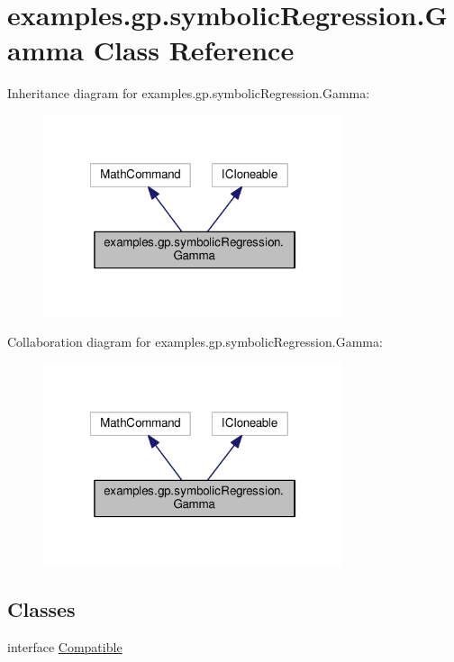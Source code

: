 \hypertarget{classexamples_1_1gp_1_1symbolic_regression_1_1_gamma}{\section{examples.\-gp.\-symbolic\-Regression.\-Gamma Class Reference}
\label{classexamples_1_1gp_1_1symbolic_regression_1_1_gamma}
}


Inheritance diagram for examples.\-gp.\-symbolic\-Regression.\-Gamma\-:
\nopagebreak
\begin{figure}[H]
\begin{center}
\leavevmode
\includegraphics[width=249pt]{classexamples_1_1gp_1_1symbolic_regression_1_1_gamma__inherit__graph}
\end{center}
\end{figure}


Collaboration diagram for examples.\-gp.\-symbolic\-Regression.\-Gamma\-:
\nopagebreak
\begin{figure}[H]
\begin{center}
\leavevmode
\includegraphics[width=249pt]{classexamples_1_1gp_1_1symbolic_regression_1_1_gamma__coll__graph}
\end{center}
\end{figure}
\subsection*{Classes}
\begin{DoxyCompactItemize}
\item 
interface \hyperlink{interfaceexamples_1_1gp_1_1symbolic_regression_1_1_gamma_1_1_compatible}{Compatible}
\end{DoxyCompactItemize}
